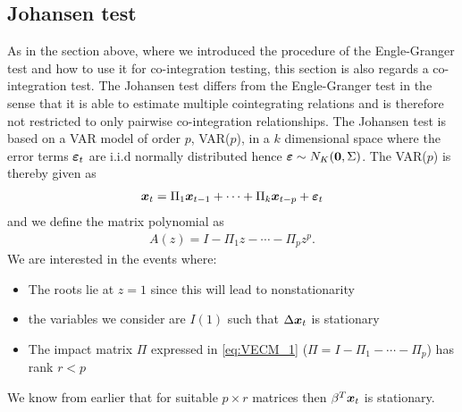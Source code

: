 \subsection{Johansen test}
As in the section above, where we introduced the procedure of the Engle-Granger test and how to use it for co-integration testing, this section is also regards a co-integration test. The Johansen test differs from the Engle-Granger test in the sense that it is able to estimate multiple cointegrating relations and is therefore not restricted to only pairwise co-integration relationships. The Johansen test is based on a VAR model of order $p$, VAR($p$), in a $k$ dimensional space where the error terms $\boldsymbol{\varepsilon}_t$ are i.i.d normally distributed hence $\boldsymbol{\varepsilon}\sim N_K(\boldsymbol{0},\Sigma)$. The VAR($p$) is thereby given as
\begin{align}\label{eq:var_p_johansen}
\boldsymbol{x}_t=\Pi_1\boldsymbol{x}_{t-1}+\cdots+\Pi_k\boldsymbol{x}_{t-p}+\boldsymbol{\varepsilon}_t
\end{align}
and we define the matrix polynomial as
\begin{align*}
    A(z)=I-\Pi_1z-\cdots-\Pi_pz^p.
\end{align*}
We are interested in the events where: 
\begin{itemize}
    \item The roots lie at $z=1$ since this will lead to nonstationarity
    \item the variables we consider are $I(1)$ such that $\Delta \boldsymbol{x}_t$ is stationary
    \item The impact matrix $\Pi$ expressed in \eqref{eq:VECM_1} ($\Pi=I-\Pi_1-\cdots-\Pi_p$) has rank $r<p$
\end{itemize}  
We know from earlier that for suitable $p\times r$ matrices then $\beta^T \boldsymbol{x}_t$ is stationary.\\\\






